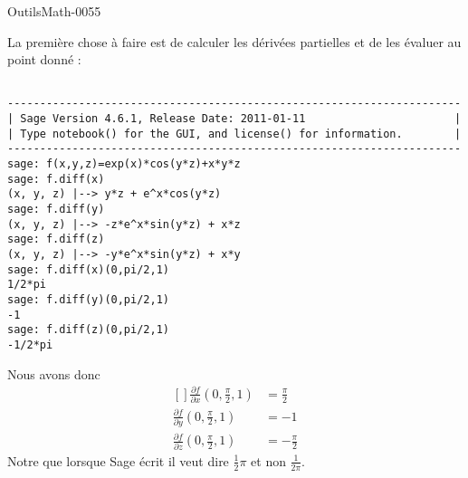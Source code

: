 
\begin{corrige}{OutilsMath-0055}

    La première chose à faire est de calculer les dérivées partielles et de les évaluer au point donné :
    \begin{verbatim}
    
----------------------------------------------------------------------
| Sage Version 4.6.1, Release Date: 2011-01-11                       |
| Type notebook() for the GUI, and license() for information.        |
----------------------------------------------------------------------
sage: f(x,y,z)=exp(x)*cos(y*z)+x*y*z
sage: f.diff(x)
(x, y, z) |--> y*z + e^x*cos(y*z)
sage: f.diff(y)
(x, y, z) |--> -z*e^x*sin(y*z) + x*z
sage: f.diff(z)
(x, y, z) |--> -y*e^x*sin(y*z) + x*y
sage: f.diff(x)(0,pi/2,1)
1/2*pi
sage: f.diff(y)(0,pi/2,1)
-1
sage: f.diff(z)(0,pi/2,1)
-1/2*pi
    \end{verbatim}
    Nous avons donc
    \begin{equation}
        \begin{aligned}[]
            \frac{ \partial f }{ \partial x }(0,\frac{ \pi }{2},1)&=\frac{ \pi }{2}\\
            \frac{ \partial f }{ \partial y }(0,\frac{ \pi }{2},1)&=-1\\
            \frac{ \partial f }{ \partial z }(0,\frac{ \pi }{2},1)&=-\frac{ \pi }{2}
        \end{aligned}
    \end{equation}
    Notre que lorsque Sage écrit  il veut dire $\frac{ 1 }{2}\pi$ et non $\frac{1}{ 2\pi }$.


\end{corrige}
